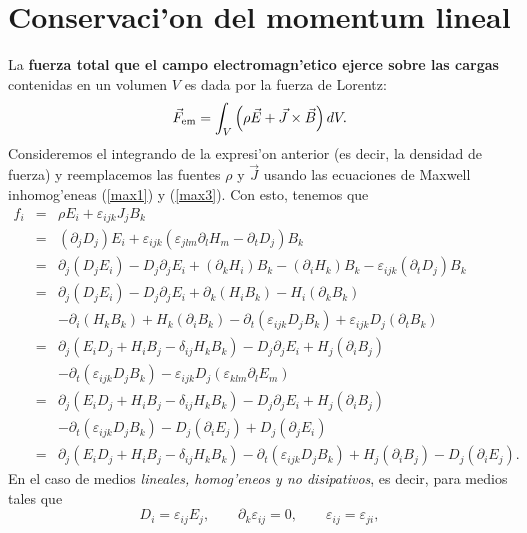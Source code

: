\section{Conservaci'on del momentum lineal}\label{sec:momentum}
La \textbf{fuerza total que el campo electromagn'etico ejerce sobre las cargas} contenidas en un volumen $V$ es dada por la fuerza de Lorentz:
\begin{equation}
\vec{F}_{\rm em}=\int_V\left(\rho\vec{E}+\vec{J}\times\vec{B}\right)dV .
\end{equation}
Consideremos el integrando de la expresi'on anterior (es decir, la densidad de fuerza) y reemplacemos las fuentes $\rho$ y $\vec{J}$ usando las ecuaciones de Maxwell inhomog'eneas (\ref{max1}) y (\ref{max3}). Con esto, tenemos que
\begin{eqnarray}
f_i&=&\rho E_i+\varepsilon_{ijk}J_jB_k \\
&=&(\partial_jD_j)E_i+\varepsilon_{ijk}(\varepsilon_{
jlm}\partial_lH_m-\partial_tD_j)B_k  \\
&=& \partial_j(D_jE_i)-D_j\partial_jE_i +
(\partial_kH_i)B_k-(\partial_iH_k)B_k-\varepsilon_{ijk}(\partial_tD_j)B_k \\
&=& \partial_j(D_jE_i)-D_j\partial_jE_i +
\partial_k(H_iB_k)-H_i(\partial_kB_k) \nonumber\\
&& -\partial_i(H_kB_k)+H_k(\partial_iB_k)
-\partial_t(\varepsilon_{ijk} D_jB_k)
+\varepsilon_{ijk} D_j(\partial_tB_k) \\
&=&\partial_j(E_iD_j+H_iB_j-\delta_{ij}H_kB_k)
-D_j\partial_jE_i+H_j(\partial_iB_j) \nonumber\\
&& -\partial_t(\varepsilon_{ijk}
D_jB_k)-\varepsilon_{ijk} D_j(\varepsilon_{klm}\partial_lE_m) \\
&=&\partial_j(E_iD_j+H_iB_j-\delta_{ij}H_kB_k)
-D_j\partial_jE_i+H_j(\partial_iB_j) \nonumber\\
&& -\partial_t(\varepsilon_{ijk} D_jB_k)-D_j(\partial_iE_j) +D_j(\partial_jE_i)\\
&=&\partial_j(E_iD_j+H_iB_j-\delta_{ij}H_kB_k)-\partial_t(\varepsilon_{ijk}
D_jB_k)+H_j(\partial_iB_j)- D_j(\partial_iE_j). \label{flc}
\end{eqnarray}
En el caso de medios \textit{lineales, homog'eneos y no disipativos}, es decir, para medios tales que
\begin{equation}
 D_i=\varepsilon_{ij}E_j, \qquad \partial_k\varepsilon_{ij}=0, \qquad \varepsilon_{ij}=\varepsilon_{ji},
\end{equation}
